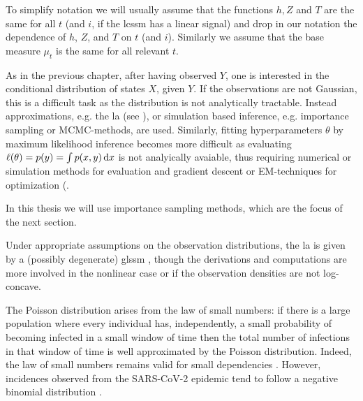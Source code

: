 \begin{remark}
    To simplify notation we will usually assume that the functions $h, Z$ and $T$ are the same for all $t$ (and $i$, if the \gls{lcssm} has a linear signal) and drop in our notation the dependence of $h$, $Z$, and $T$ on $t$ (and $i$). Similarly we assume that the base measure $\mu_t$ is the same for all relevant $t$.
\end{remark}

As in the previous chapter, after having observed $Y$, one is interested in the conditional distribution of states $X$, given $Y$. If the observations are not Gaussian, this is a difficult task as the distribution is not analytically tractable. Instead approximations, e.g. the \gls{la} (see ), or simulation based inference, e.g. importance sampling or MCMC-methods, are used. Similarly, fitting hyperparameters $\theta$ by maximum likelihood inference becomes more difficult as evaluating $\ell(\theta) = p(y) = \int p(x,y) \,\mathrm d x$ is not analyically avaiable, thus requiring numerical or simulation methods for evaluation and  gradient descent or EM-techniques for optimization (.

In this thesis we will use importance sampling methods, which are the focus of the next section. 

Under appropriate assumptions on the observation distributions, the \gls{la} is given by a (possibly degenerate) \gls{glssm} \cite{Durbin1997Monte, Shephard1997Likelihood}, though the derivations and computations are more involved in the nonlinear case or if the observation densities are not log-concave.

\begin{theorem}
    
\end{theorem}

The Poisson distribution arises from the law of small numbers: if there is a large population where every individual has, independently, a small probability of becoming infected in a small window of time then the total number of infections in that window of time is well approximated by the Poisson distribution.
Indeed, the law of small numbers remains valid for small dependencies \cite{Ross2011Fundamentalsa,Arratia1990Poisson}.
However, incidences observed from the SARS-CoV-2 epidemic tend to follow a negative binomial distribution \cite{Chan2021Count}. 




